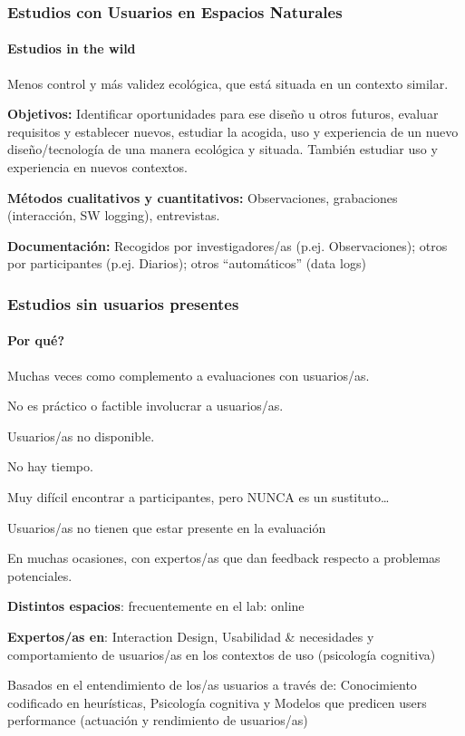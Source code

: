 \documentclass[12pt]{report} %
\begin{document}
\subsubsection{Estudios con Usuarios en Espacios Naturales}
\paragraph{Estudios in the wild}        
Menos control y más validez ecológica, que está situada en un contexto similar.
          
\textbf{Objetivos:} Identificar oportunidades para ese diseño u otros futuros, evaluar requisitos y establecer nuevos, estudiar la acogida, uso y experiencia de un nuevo diseño/tecnología de una manera ecológica y situada. También estudiar uso y experiencia en nuevos contextos.
          
\textbf{Métodos cualitativos y cuantitativos:} Observaciones, grabaciones (interacción, SW logging), entrevistas.

\textbf{Documentación:} Recogidos por investigadores/as (p.ej. Observaciones); otros por participantes (p.ej. Diarios); otros “automáticos” (data logs)

\subsubsection{Estudios sin usuarios presentes}
\paragraph{Por qué?}        
Muchas veces como complemento a evaluaciones con usuarios/as.

No es práctico o factible involucrar a usuarios/as.

Usuarios/as no disponible.

No hay tiempo.

Muy difícil encontrar a participantes, pero NUNCA es un sustituto…

Usuarios/as no tienen que estar presente en la evaluación

En muchas ocasiones, con expertos/as que dan feedback respecto a problemas
potenciales.

\textbf{Distintos espacios}: frecuentemente en el lab: online

\textbf{Expertos/as en}: Interaction Design, Usabilidad \& necesidades y comportamiento de usuarios/as en los contextos de uso (psicología cognitiva)

Basados en el entendimiento de los/as usuarios a través de: Conocimiento codificado en heurísticas, Psicología cognitiva y Modelos que predicen users performance (actuación y rendimiento de usuarios/as)
\end{document}
